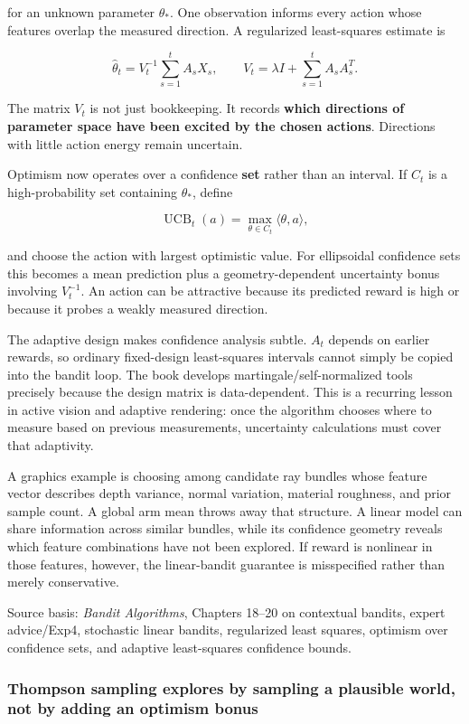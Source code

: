 for an unknown parameter \(\theta_*\). One observation informs every action whose features overlap the measured direction. A regularized least-squares estimate is

\[
\hat\theta_t
=
V_t^{-1}
\sum_{s=1}^{t}A_sX_s,
\qquad
V_t
=
\lambda I+\sum_{s=1}^{t}A_sA_s^T.
\]

The matrix \(V_t\) is not just bookkeeping. It records \textbf{which directions of parameter space have been excited by the chosen actions}. Directions with little action energy remain uncertain.

Optimism now operates over a confidence \textbf{set} rather than an interval. If \(C_t\) is a high-probability set containing \(\theta_*\), define

\[
\operatorname{UCB}_t(a)
=
\max_{\theta\in C_t}
\langle\theta,a\rangle,
\]

and choose the action with largest optimistic value. For ellipsoidal confidence sets this becomes a mean prediction plus a geometry-dependent uncertainty bonus involving \(V_t^{-1}\). An action can be attractive because its predicted reward is high or because it probes a weakly measured direction.

The adaptive design makes confidence analysis subtle. \(A_t\) depends on earlier rewards, so ordinary fixed-design least-squares intervals cannot simply be copied into the bandit loop. The book develops martingale/self-normalized tools precisely because the design matrix is data-dependent. This is a recurring lesson in active vision and adaptive rendering: once the algorithm chooses where to measure based on previous measurements, uncertainty calculations must cover that adaptivity.

A graphics example is choosing among candidate ray bundles whose feature vector describes depth variance, normal variation, material roughness, and prior sample count. A global arm mean throws away that structure. A linear model can share information across similar bundles, while its confidence geometry reveals which feature combinations have not been explored. If reward is nonlinear in those features, however, the linear-bandit guarantee is misspecified rather than merely conservative.

Source basis: \emph{Bandit Algorithms}, Chapters 18--20 on contextual bandits, expert advice/Exp4, stochastic linear bandits, regularized least squares, optimism over confidence sets, and adaptive least-squares confidence bounds.

\subsubsection{Thompson sampling explores by sampling a plausible world, not by adding an optimism bonus}\label{thompson-sampling-explores-by-sampling-a-plausible-world-not-by-adding-an-optimism-bonus}

